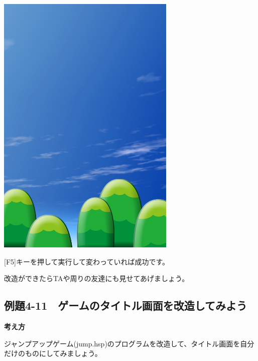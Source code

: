 \documentclass[a4paper,12pt]{jarticle}
\begin{document}
\begin{minipage}{9.781cm}
\centering
{\upshape
\includegraphics[keepaspectratio,width=8.546cm,height=12.804cm]{text04-img/text04-img032.jpg}}
\end{minipage}

\bigskip
\bigskip
\bigskip


[F5]キーを押して実行して変わっていれば成功です。

\bigskip

改造ができたらTAや周りの友達にも見せてあげましょう。

\bigskip


\clearpage
\subsection{例題4-11　ゲームのタイトル画面を改造してみよう}
\bigskip
\bigskip

{\bfseries
考え方}

\bigskip

ジャンプアップゲーム(jump.hsp)のプログラムを改造して、タイトル画面を自分だけのものにしてみましょう。

\bigskip
\bigskip
\end{document}
